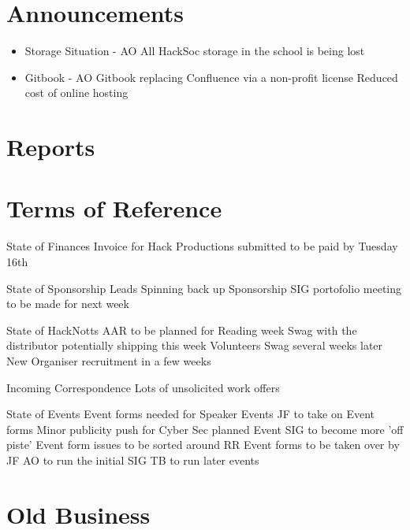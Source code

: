 \documentclass[11pt,hacksoc]{meetingmins}
\begin{document}
\maketitle

\section{Announcements}
\begin{itemize}
\item Storage Situation - AO
\subitem All HackSoc storage in the school is being lost
\item Gitbook - AO
\subitem Gitbook replacing Confluence via a non-profit license
\subitem Reduced cost of online hosting
\end{itemize}

\section{Reports}

\section{Terms of Reference}
\begin{items}
\item {State of Finances}
\subitem Invoice for Hack Productions submitted to be paid by Tuesday 16th
\item {State of Sponsorship Leads}
\subitem Spinning back up
\subitem Sponsorship SIG portofolio meeting to be made for next week
\item {State of HackNotts}
\subitem AAR to be planned for Reading week
\subitem Swag with the distributor potentially shipping this week
\subitem Volunteers Swag several weeks later
\subitem New Organiser recruitment in a few weeks
\item {Incoming Correspondence}
\subitem Lots of unsolicited work offers
\item {State of Events}
\subitem Event forms needed for Speaker Events
\subitem JF to take on Event forms
\subitem Minor publicity push for Cyber Sec planned
\subitem Event SIG to become more 'off piste' 
\subitem Event form issues to be sorted around RR
\subitem Event forms to be taken over by JF
\subitem AO to run the initial SIG
\subitem TB to run later events
\end{items}

\section{Old Business}
\end{document}

